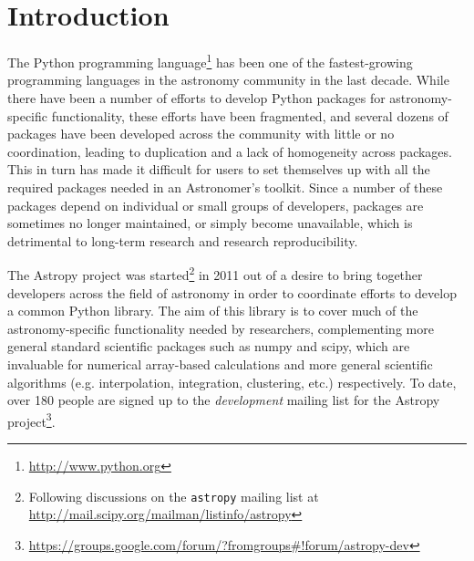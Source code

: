 \documentclass[traditabstract]{aa}
\begin{document}

\maketitle



\section{Introduction}


The Python programming language\footnote{\url{http://www.python.org}} has been
one of the fastest-growing programming languages in the astronomy community in
the last decade. While there have been a number of efforts to develop Python
packages for astronomy-specific functionality, these efforts have been
fragmented, and several dozens of packages have been developed across the
community with little or no coordination, leading to duplication and a lack of
homogeneity across packages. This in turn has made it difficult for users to
set themselves up with all the required packages needed in an Astronomer's toolkit.
Since a number of these packages depend on individual or small groups of
developers, packages are sometimes no longer maintained, or simply become
unavailable, which is detrimental to long-term research and research
reproducibility.

The Astropy project was started\footnote{Following discussions on
the \texttt{astropy} mailing list at
\url{http://mail.scipy.org/mailman/listinfo/astropy}} in 2011 out of a desire
to bring together developers across the field of astronomy in order to
coordinate efforts to develop a common Python library. The aim of this library
is to cover much of the astronomy-specific functionality needed by
researchers, complementing more general standard scientific packages such as
\gls{numpy} and \gls{scipy},
which are invaluable for numerical array-based calculations and more general
scientific algorithms (e.g. interpolation, integration, clustering, etc.)
respectively. To date, over 180 people are signed up to the
\textit{development} mailing list for the Astropy project\footnote{
\url{https://groups.google.com/forum/?fromgroups#!forum/astropy-dev}}.
\end{document}

